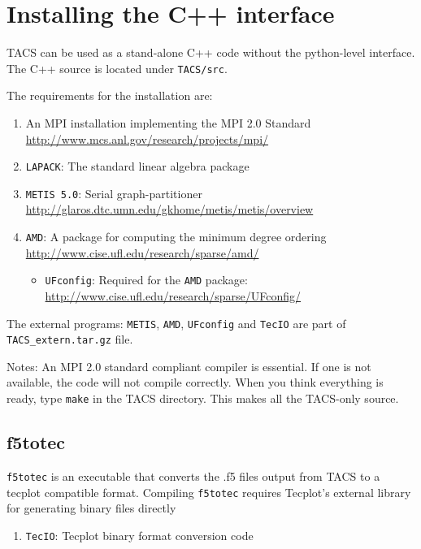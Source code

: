 \documentclass{article}
\begin{document}
\section{Installing the C++ interface}

TACS can be used as a stand-alone C++ code without the python-level
interface. The C++ source is located under \texttt{TACS/src}. 

The requirements for the installation are:
%
\begin{enumerate}
\item An MPI installation implementing the MPI 2.0 Standard
  \url{http://www.mcs.anl.gov/research/projects/mpi/}
\item \texttt{LAPACK}: The standard linear algebra package
\item \texttt{METIS 5.0}: Serial graph-partitioner
  \url{http://glaros.dtc.umn.edu/gkhome/metis/metis/overview}
\item \texttt{AMD}: A package for computing the minimum degree
  ordering \url{http://www.cise.ufl.edu/research/sparse/amd/}
  \begin{itemize}
  \item \texttt{UFconfig}: Required for the \texttt{AMD} package:
    \url{http://www.cise.ufl.edu/research/sparse/UFconfig/}
  \end{itemize}
\end{enumerate}

The external programs: \texttt{METIS}, \texttt{AMD}, \texttt{UFconfig}
and \texttt{TecIO} are part of \texttt{TACS\_extern.tar.gz} file.

Notes: An MPI 2.0 standard compliant compiler is essential. If one is
not available, the code will not compile correctly. When you
think everything is ready, type \texttt{make} in the TACS
directory. This makes all the TACS-only source.

\subsection{f5totec}

\texttt{f5totec} is an executable that converts the .f5 files output 
from TACS to a tecplot compatible format. Compiling \texttt{f5totec}
requires Tecplot's external library for generating binary files
directly

\begin{enumerate}
\item \texttt{TecIO}: Tecplot binary format conversion code
\end{enumerate}
\end{document}
